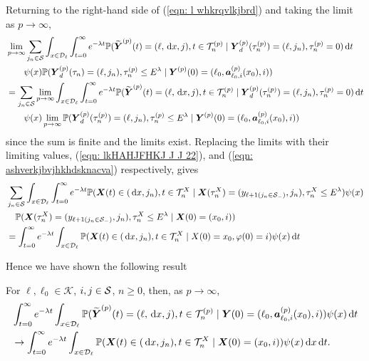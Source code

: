 Returning to the right-hand side of (\ref{eqn: l whkrqvlkjbrd}) and taking the limit as \(p\to\infty\), 
\begin{align}
	&\lim_{p\to\infty} \sum_{j_n\in\mathcal S}
	\int_{x\in\mathcal{D}_\ell} \int_{t=0}^\infty e^{-\lambda t} \mathbb P(\widetilde{\boldsymbol Y}^{(p)}(t) = (\ell,\, \mathrm{d} x, j), 
	t\in\mathcal T_n^{(p)} \mid \nonumber 
	 \boldsymbol Y_d^{(p)}(\tau_n^{(p)}) = (\ell,j_n), \tau_{n}^{(p)}= 0)\, \mathrm{d} t 
	 \\&\qquad{}\psi(x)  \mathbb P(\boldsymbol Y_d^{(p)}(\tau_n) = (\ell, j_n), \tau_{n}^{(p)}\leq E^\lambda 
	 \mid \boldsymbol Y^{(p)}(0)=(\ell_0,\boldsymbol  a_{\ell_0,i}^{(p)}(x_0),i))\nonumber
	 \\&= \sum_{j_n\in\mathcal S}
	\lim_{p\to\infty} \int_{x\in\mathcal{D}_\ell} \int_{t=0}^\infty e^{-\lambda t}  \mathbb P(\widetilde{\boldsymbol Y}^{(p)}(t) = (\ell,\, \mathrm{d} x,j), 
	t\in\mathcal T_n^{(p)} \mid \nonumber 
	 \boldsymbol Y_d^{(p)}(\tau_n^{(p)}) = (\ell,j_n), 
	  \tau_{n}^{(p)}= 0)\, \mathrm{d} t \\&\qquad{} \psi(x) 
	 \lim_{p\to\infty} \mathbb P(\boldsymbol Y_d^{(p)}(\tau_n^{(p)}) = (\ell, j_n), \tau_{n}^{(p)}\leq E^\lambda 
	 \mid \boldsymbol Y^{(p)}(0)=(\ell_0, \boldsymbol  a_{\ell_0,i}^{(p)}(x_0),i))\nonumber
\end{align}
since the sum is finite and the limits exist. Replacing the limits with their limiting values, (\ref{eqn: lkHAHJFHKJ J J 22}), and (\ref{eqn: ashverkjbvjhkhdsknacva}) respectively, gives 
\begin{align}
	 &\sum_{j_n\in\mathcal S}\int_{x\in\mathcal{D}_\ell} \int_{t=0}^\infty e^{-\lambda t} \mathbb P(\boldsymbol X(t)\in(\, \mathrm{d} x, j_n), t\in\mathcal T_n^{X} \mid \boldsymbol X(\tau_n^X) = (y_{\ell+1(j_n\in\mathcal S_-)}, j_n),\nonumber 
	 \tau_n^X\leq E^\lambda ) \psi(x)
	 \\&\quad{} \mathbb P(\boldsymbol X(\tau_n^X) = (y_{\ell+1(j_{n}\in\mathcal S_-)}, 
		j_n), \tau_{n}^X\leq E^\lambda
		\mid \boldsymbol X(0)=(x_0,i))\nonumber
	\\&= \int_{t=0}^\infty e^{-\lambda t}  \int_{x\in\mathcal{D}_\ell}\mathbb P(\boldsymbol X(t)\in(\, \mathrm{d} x, j_n), t\in\mathcal T_n^{X} 
	\mid X(0)=x_0, \varphi(0)=i)\psi(x)\, \mathrm{d} t
\end{align}

Hence we have shown the following result 
\begin{lem}\label{lem: LAkAKFnvnb mav h}
	For \(\ell,\ell_0\in\mathcal K\), \(i,j\in\mathcal{S}\), \(n\geq 0\), then, as \(p\to\infty\), 
	\begin{align}
		&\int_{t=0}^\infty e^{-\lambda t}\int_{x\in\mathcal{D}_\ell}\mathbb P(\widetilde{\boldsymbol Y}^{(p)}(t) = (\ell,\, \mathrm{d} x, j), t\in\mathcal T_n^{(p)} \mid  \nonumber 
		\boldsymbol Y(0) = (\ell_0, \boldsymbol a_{\ell_0,i}^{(p)}(x_0), i))\psi(x)\, \mathrm{d} t \nonumber
		\\&\to\int_{t=0}^\infty e^{-\lambda t}  \int_{x\in\mathcal{D}_\ell}\mathbb P(\boldsymbol X(t)\in(\, \mathrm{d} x, j_n), t\in\mathcal T_n^{X} 
		\mid \boldsymbol X(0)=(x_0,i))\psi(x)\, \mathrm{d} x\, \mathrm{d} t.
	\end{align}
\end{lem}

